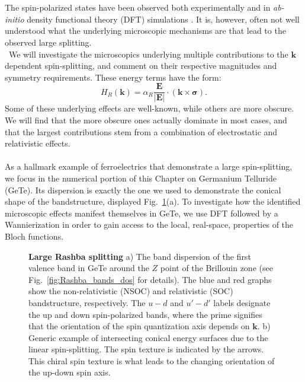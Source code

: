 \\\\
The spin-polarized states have been observed both experimentally \cite{Ishizaka2011,Liebmann2016,Krempasky2015} and in {\it ab-initio} density functional theory (DFT) simulations \cite{DiSante2013, Kim2014, Picozzi2014}.
It is, however, often not well understood what the underlying microscopic mechanisms are that lead to the observed large splitting.
\\\
We will investigate the microscopics underlying multiple contributions to the $\bm{k}$ dependent spin-splitting, and comment on their respective magnitudes and symmetry requirements. 
These energy terms have the form:
\begin{equation}
	\label{eq:Rashba_form}
	H_R(\bm{k}) = \alpha_R \frac{\bm{E}}{|\bm{E}|} \cdot (\bm{k} \times \bm{\sigma}).
\end{equation}
Some of these underlying effects are well-known, while others are more obscure.
We will find that the more obscure ones actually dominate in most cases, and that the largest contributions stem from a combination of electrostatic and relativistic effects.
\\\\
As a hallmark example of ferroelectrics that demonstrate a large spin-splitting, we focus in the numerical portion of this Chapter on Germanium Telluride (GeTe).
Its dispersion is exactly the one we used to demonstrate the conical shape of the bandstructure, displayed Fig.~\ref{fig:Rashba_intro_dispersion}(a).
To investigate how the identified microscopic effects manifest themselves in GeTe, we use DFT followed by a Wannierization in order to gain access to the local, real-space, properties of the Bloch functions.
\begin{figure}[h]
	\caption{\label{fig:Rashba_intro_dispersion}
		{\bf Large Rashba splitting} a) The band dispersion of the first valence band in GeTe around the $Z$ point of the Brillouin zone (see Fig.~\ref{fig:Rashba_bands_dos} for details). The blue and red graphs show the non-relativistic (NSOC) and relativistic (SOC) bandstructure, respectively. The $u-d$ and $u'-d'$ labels designate the up and down spin-polarized bands, where the prime signifies that the orientation of the spin quantization axis depends on $\bm{k}$. b) Generic example of intersecting conical energy surfaces due to the linear spin-splitting. The spin texture is indicated by the arrows. This chiral spin texture is what leads to the changing orientation of the up-down spin axis.}
\end{figure}

